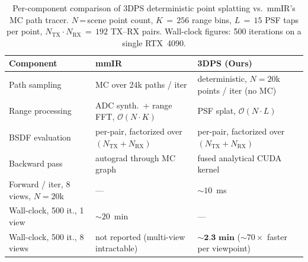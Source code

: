 \begin{table}[t]
\centering
\caption{Per-component comparison of 3DPS deterministic point splatting vs.\ mmIR's MC path tracer. $N$\,=\,scene point count, $K\,{=}\,256$ range bins, $L\,{=}\,15$ PSF taps per point, $N_{\text{TX}}\!\cdot\!N_{\text{RX}}\,{=}\,192$ TX--RX pairs. Wall-clock figures: 500 iterations on a single RTX~4090.}
\label{tab:complexity}
\small
\setlength{\tabcolsep}{6pt}
\renewcommand{\arraystretch}{1.15}
\begin{tabular}{lll}
\toprule
\textbf{Component} & \textbf{mmIR~\cite{mmIR2026}} & \textbf{3DPS (Ours)} \\
\midrule
Path sampling      & MC over $24$k paths / iter            & deterministic, $N{=}20$k points / iter (no MC) \\
Range processing   & ADC synth.\ + range FFT, $\mathcal{O}(N\!\cdot\!K)$ & PSF splat, $\mathcal{O}(N\!\cdot\!L)$ \\
BSDF evaluation    & per-pair, factorized over $(N_{\text{TX}}{+}N_{\text{RX}})$ & per-pair, factorized over $(N_{\text{TX}}{+}N_{\text{RX}})$ \\
Backward pass      & autograd through MC graph           & fused analytical CUDA kernel \\
\midrule
Forward / iter, 8 views, $N{=}20$k & ---  & ${\sim}10$~ms \\
Wall-clock, 500 it., 1 view        & ${\sim}20$~min  & ---  \\
Wall-clock, 500 it., 8 views       & not reported (multi-view intractable) & $\boldsymbol{\sim}\textbf{2.3 min}$ (${\sim}70\times$ faster per viewpoint) \\
\bottomrule
\end{tabular}
\end{table}
